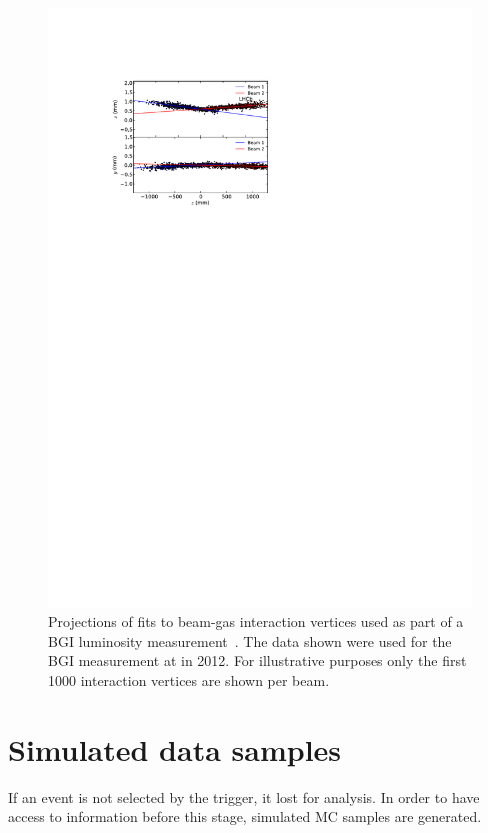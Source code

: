 \begin{figure}
  \centering
  \includegraphics[width=\textwidth]{figures/production/bgi_fits}
  \caption{%
    Projections of fits to beam-gas interaction vertices used as part of a 
    \acl{BGI} luminosity measurement~\cite{LHCb-PAPER-2014-047}.
    The data shown were used for the \ac{BGI} measurement at  in 
    2012.
    For illustrative purposes only the first \num{1000} interaction vertices 
    are shown per beam.
  }
  \label{fig:prod:data:lumi:bgi_fits}
\end{figure}

\section{Simulated data samples}
\label{chap:prod:data:mc}

If an event is not selected by the trigger, it lost for analysis.
In order to have access to information before this stage, simulated \acf{MC} 
samples are generated.

